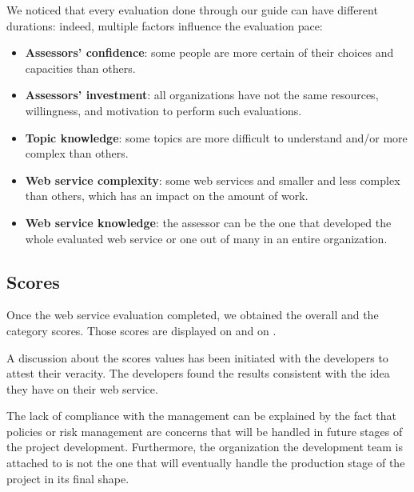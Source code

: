 We noticed that every evaluation done through our guide can have different durations: indeed, multiple factors influence the evaluation pace:
\begin{itemize}
	\item \textbf{Assessors' confidence}: some people are more certain of their choices and capacities than others.
	\item \textbf{Assessors' investment}: all organizations have not the same resources, willingness, and motivation to perform such evaluations.
	\item \textbf{Topic knowledge}: some topics are more difficult to understand and/or more complex than others.
	\item \textbf{Web service complexity}: some web services and smaller and less complex than others, which has an impact on the amount of work.
	\item \textbf{Web service knowledge}: the assessor can be the one that developed the whole evaluated web service or one out of many in an entire organization.
\end{itemize}

\subsection{Scores}
\label{subsec:use_results_scores}

Once the web service evaluation completed, we obtained the overall and the category scores. Those scores are displayed on  and on .



A discussion about the scores values has been initiated with the developers to attest their veracity. The developers found the results consistent with the idea they have on their web service.

The lack of compliance with the management can be explained by the fact that policies or risk management are concerns that will be handled in future stages of the project development. Furthermore, the organization the development team is attached to is not the one that will eventually handle the production stage of the project in its final shape.

